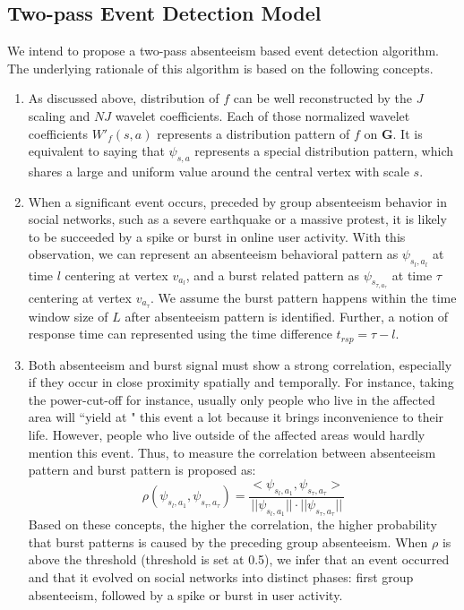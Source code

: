 \subsection{Two-pass Event Detection Model}

We intend to propose a two-pass absenteeism based event detection algorithm. The underlying rationale of this algorithm is based on the following concepts.
\begin{enumerate}
\item As discussed above, distribution of $f$ can be well reconstructed by the $J$ scaling and $NJ$ wavelet coefficients. Each of those normalized wavelet coefficients $W'_f(s,a)$ represents a distribution pattern of $f$ on $\mathbf{G}$.
It is equivalent to saying that $\psi_{s,a}$ represents a special distribution pattern, which shares a large and uniform value around the central vertex with scale $s$.
\item When a significant event occurs, preceded by group absenteeism behavior in social networks, such as a severe earthquake or a massive protest, it is likely to be succeeded by a spike or burst in online user activity.
With this observation, we can represent an absenteeism behavioral pattern as $\psi_{s_l,a_l}$ at time $l$ centering at vertex $v_{a_l}$, and a burst related pattern as $\psi_{s_{\tau,a_\tau}}$ at time $\tau$ centering at vertex $v_{a_\tau}$. We assume the burst pattern happens within the time window size of $L$ after absenteeism pattern is identified. Further, a notion of response time can represented using the time difference $t_{rsp}=\tau-l$.
\item Both absenteeism and burst signal must show a strong correlation, especially if they occur in close proximity spatially and temporally.
For instance, taking the power-cut-off for instance, usually only people who live in the affected area will ``yield at " this event a lot because it brings inconvenience to their life. However, people who live outside of the affected areas would hardly mention this event. Thus, to measure the correlation between absenteeism pattern and burst pattern is proposed as:
\begin{equation}
\label{eq:eventsimilarity}
\rho(\psi_{s_l,a_1}, \psi_{s_\tau,a_\tau})= \frac{<\psi_{s_l,a_1}, \psi_{s_\tau,a_\tau}>}{||\psi_{s_l,a_1}||\cdot ||\psi_{s_\tau,a_\tau}||}
\end{equation}
Based on these concepts, the higher the correlation, the higher probability that burst patterns is caused by the preceding group absenteeism. When $\rho$ is above the threshold (threshold is set at 0.5), we infer that an event occurred and that it evolved on social networks into distinct phases: first group absenteeism, followed by a spike or burst in user activity.
\end{enumerate}



